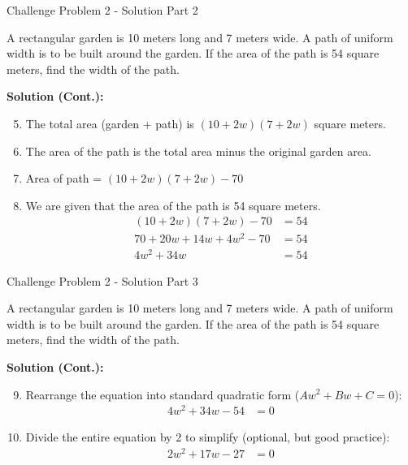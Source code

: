 \documentclass[aspectratio=169]{beamer}
\begin{document}
\begin{frame}{Challenge Problem 2 - Solution Part 2}
    \begin{tcolorbox}[colback=lightgray,colframe=accent,title=Detailed Solution (Part 2)]
        \footnotesize
        A rectangular garden is 10 meters long and 7 meters wide. A path of uniform width is to be built around the garden. If the area of the path is 54 square meters, find the width of the path.
        
        \textbf{Solution (Cont.):}
        \begin{enumerate}
            \setcounter{enumi}{4} %
            \setlength{\itemsep}{0.5em}
            \item The total area (garden + path) is $(10 + 2w)(7 + 2w)$ square meters.
            \item The area of the path is the total area minus the original garden area.
            \item Area of path = $(10 + 2w)(7 + 2w) - 70$
            \item We are given that the area of the path is 54 square meters.
            \begin{align*}
                (10 + 2w)(7 + 2w) - 70 &= 54 \\
                70 + 20w + 14w + 4w^2 - 70 &= 54 \\
                4w^2 + 34w &= 54
            \end{align*}
        \end{enumerate}
    \end{tcolorbox}
\end{frame}

\begin{frame}{Challenge Problem 2 - Solution Part 3}
    \begin{tcolorbox}[colback=lightgray,colframe=accent,title=Detailed Solution (Part 3)]
        \footnotesize
        A rectangular garden is 10 meters long and 7 meters wide. A path of uniform width is to be built around the garden. If the area of the path is 54 square meters, find the width of the path.
        
        \textbf{Solution (Cont.):}
        \begin{enumerate}
            \setcounter{enumi}{8} %
            \setlength{\itemsep}{0.5em}
            \item Rearrange the equation into standard quadratic form ($Aw^2 + Bw + C = 0$):
            \begin{align*}
                4w^2 + 34w - 54 &= 0
            \end{align*}
            \item Divide the entire equation by 2 to simplify (optional, but good practice):
            \begin{align*}
                2w^2 + 17w - 27 &= 0
            \end{align*}
        \end{enumerate}
    \end{tcolorbox}
\end{frame}
\end{document}
